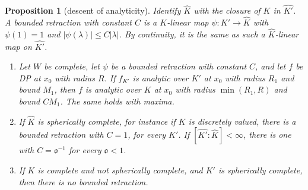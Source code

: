 \documentclass[11pt]{amsart}
\newtheorem{proposition}[theorem]{Proposition}
\theoremstyle{definition}
\theoremstyle{remark}
\numberwithin{equation}{section}
\newcommand{\abs}[1]{\lvert #1\rvert}
\newcommand{\Kh}{\widehat K}
\theoremstyle{plain}
\theoremstyle{definition}
\theoremstyle{plain}
\begin{document}
\begin{proposition}[descent of analyticity]\label{dp:prop:an-descent}
Identify $\Kh$ with the closure of $K$ in $\widehat{K'}$. A \emph{bounded retraction} with constant $C$ is a $K$-linear map $\psi\colon K'\to\Kh$ with $\psi(1)=1$ and $\abs{\psi(\lambda)}\le C\abs\lambda$. By continuity, it is the same as such a $\Kh$-linear map on $\widehat{K'}$.
\begin{enumerate}
\item Let $W$ be complete, let $\psi$ be a bounded retraction with constant $C$, and let $f$ be DP at $x_0$ with radius $R$. If $f_{K'}$ is analytic over $K'$ at $x_0$ with radius $R_1$ and bound $M_1$, then $f$ is analytic over $K$ at $x_0$ with radius $\min(R_1,R)$ and bound $CM_1$. The same holds with maxima.
\item If $\Kh$ is spherically complete, for instance if $K$ is discretely valued, there is a bounded retraction with $C=1$, for every $K'$. If $[\widehat{K'}:\Kh]<\infty$, there is one with $C=\mathfrak o^{-1}$ for every $\mathfrak o<1$.
\item If $K$ is complete and not spherically complete, and $K'$ is spherically complete, then there is no bounded retraction.
\end{enumerate}
\end{proposition}
\end{document}
